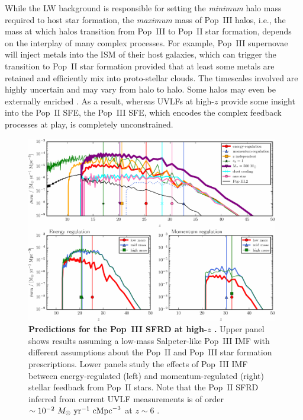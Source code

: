 While the LW background is responsible for setting the \textit{minimum} halo mass required to host star formation, the \textit{maximum} mass of Pop~III halos, i.e., the mass at which halos transition from Pop~III to Pop~II star formation, depends on the interplay of many complex processes. For example, Pop~III supernovae will inject metals into the ISM of their host galaxies, which can trigger the transition to Pop~II star formation provided that at least some metals are retained and efficiently mix into proto-stellar clouds. The timescales involved are highly uncertain and may vary from halo to halo. Some halos may even be externally enriched \cite{Smith2015}. As a result, whereas UVLFs at high-$z$ provide some insight into the Pop~II SFE, the Pop~III SFE, which encodes the complex feedback processes at play, is completely unconstrained. 

\begin{figure}[]
\begin{center}
\includegraphics[width=0.98\textwidth]{Mirocha/mebane2018_fig7.pdf}
\end{center}
\caption{{\bf Predictions for the Pop~III SFRD at high-$z$ \cite{Mebane2018}.} Upper panel shows results assuming a low-mass Salpeter-like Pop~III IMF with different assumptions about the Pop~II and Pop~III star formation prescriptions. Lower panels study the effects of Pop~III IMF between energy-regulated (left) and momentum-regulated (right) stellar feedback from Pop~II stars. Note that the Pop~II SFRD inferred from current UVLF measurements is of order $\sim 10^{-2} \ \sfrdunits$ at $z \sim 6$ \cite{Bouwens2015,Finkelstein2015}.}
\label{fig:popIII_sfrd}
\end{figure}

